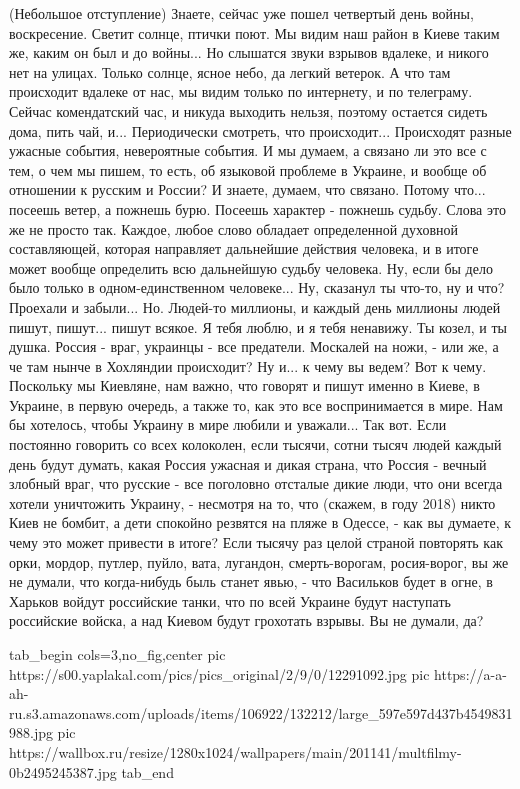 (Небольшое отступление) Знаете, сейчас уже пошел четвертый день войны,
воскресение. Светит солнце, птички поют. Мы видим наш район в Киеве таким же,
каким он был и до войны...  Но слышатся звуки взрывов вдалеке, и никого нет на
улицах. Только солнце, ясное небо, да легкий ветерок.  А что там происходит
вдалеке от нас, мы видим только по интернету, и по телеграму.  Сейчас
комендатский час, и никуда выходить нельзя, поэтому остается сидеть дома, пить
чай, и...  Периодически смотреть, что происходит...  Происходят разные ужасные
события, невероятные события. И мы думаем, а связано ли это все с тем, о чем мы
пишем, то есть, об языковой проблеме в Украине, и вообще об отношении к русским
и России? И знаете, думаем, что связано. Потому что...  посеешь ветер, а
пожнешь бурю. Посеешь характер - пожнешь судьбу. Слова это же не просто так.
Каждое, любое слово обладает определенной духовной составляющей, которая
направляет дальнейшие действия человека, и в итоге может вообще определить всю
дальнейшую судьбу человека. Ну, если бы дело было только в одном-единственном
человеке... Ну, сказанул ты что-то, ну и что? Проехали и забыли... Но. Людей-то
миллионы, и каждый день миллионы людей пишут, пишут...  пишут всякое. Я тебя
люблю, и я тебя ненавижу.  Ты козел, и ты душка. Россия - враг, украинцы - все
предатели. Москалей на ножи, - или же, а че там нынче в Хохляндии происходит?
Ну и... к чему вы ведем? Вот к чему. Поскольку мы Киевляне, нам важно, что
говорят и пишут именно в Киеве, в Украине, в первую очередь, а также то, как
это все воспринимается в мире. Нам бы хотелось, чтобы Украину в мире любили и
уважали... Так вот. Если постоянно говорить со всех колоколен, если тысячи,
сотни тысяч людей каждый день будут думать, какая Россия ужасная и дикая
страна, что Россия - вечный злобный враг, что русские - все поголовно отсталые
дикие люди, что они всегда хотели уничтожить Украину, - несмотря на то, что
(скажем, в году 2018) никто Киев не бомбит, а дети спокойно резвятся на пляже в
Одессе, - как вы думаете, к чему это может привести в итоге? Если тысячу раз целой страной
повторять как  орки, мордор, путлер, пуйло, вата, лугандон, смерть-ворогам, росия-ворог, вы
же не думали, что когда-нибудь быль станет явью, - что Васильков будет в огне,
в Харьков войдут российские танки, что по всей Украине будут наступать
российские войска, а над Киевом будут грохотать взрывы. Вы не думали, да? 

\ifcmt
  tab_begin cols=3,no_fig,center
     pic https://s00.yaplakal.com/pics/pics_original/2/9/0/12291092.jpg
     pic https://a-a-ah-ru.s3.amazonaws.com/uploads/items/106922/132212/large_597e597d437b4549831988.jpg
     pic https://wallbox.ru/resize/1280x1024/wallpapers/main/201141/multfilmy-0b2495245387.jpg
  tab_end
\fi

